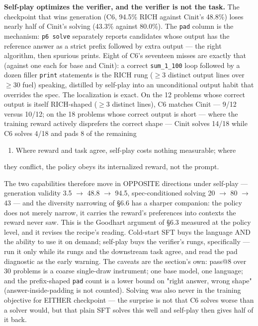 \documentclass[11pt]{article}
\newcommand{\code}[1]{\texttt{#1}}
\begin{document}
\textbf{Self-play optimizes the verifier, and the verifier is not the task.} The
checkpoint that wins generation (C6, 94.5\% RICH against Cinit's 48.8\%) loses
nearly half of Cinit's solving (43.3\% against 80.0\%). The \code{pad} column is the
mechanism: \code{p6 solve} separately reports candidates whose output has the
reference answer as a strict prefix followed by extra output --- the right
algorithm, then spurious prints. Eight of C6's seventeen misses are exactly
that (against one each for base and Cinit): a correct \code{sum\_1\_100} loop
followed by a dozen filler \code{print} statements is the RICH rung ($\ge$3 distinct
output lines over $\ge$30 fuel) speaking, distilled by self-play into an
unconditional output habit that overrides the spec. The localization is exact.
On the 12 problems whose correct output is itself RICH-shaped ($\ge$3 distinct
lines), C6 matches Cinit --- 9/12 versus 10/12; on the 18 problems whose correct
output is short --- where the training reward actively disprefers the correct
shape --- Cinit solves 14/18 while C6 solves 4/18 and pads 8 of the remaining
\begin{enumerate}[leftmargin=*]
\item Where reward and task agree, self-play costs nothing measurable; where
\end{enumerate}
they conflict, the policy obeys its internalized reward, not the prompt.

The two capabilities therefore move in OPPOSITE directions under self-play ---
generation validity 3.5 $\rightarrow$ 48.8 $\rightarrow$ 94.5, spec-conditioned solving 20 $\rightarrow$ 80 $\rightarrow$ 43 ---
and the diversity narrowing of \S{}6.6 has a sharper companion: the policy does
not merely narrow, it carries the reward's preferences into contexts the
reward never saw. This is the Goodhart argument of \S{}6.3 measured at the policy
level, and it revises the recipe's reading. Cold-start SFT buys the language
AND the ability to use it on demand; self-play buys the verifier's rungs,
specifically --- run it only while its rungs and the downstream task agree, and
read the pad diagnostic as the early warning. The caveats are the section's
own: pass@8 over 30 problems is a coarse single-draw instrument; one base
model, one language; and the prefix-shaped \code{pad} count is a lower bound on
"right answer, wrong shape" (answer-inside-padding is not counted). Solving
was also never in the training objective for EITHER checkpoint --- the surprise
is not that C6 solves worse than a solver would, but that plain SFT solves
this well and self-play then gives half of it back.
\end{document}
